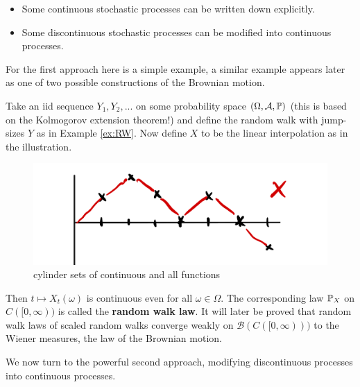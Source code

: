 \begin{itemize}
	\item Some continuous stochastic processes can be written down explicitly.
	\item Some discontinuous stochastic processes can be modified into continuous processes.
\end{itemize}
For the first approach here is a simple example, a similar example appears later as one of two possible constructions of the Brownian motion.
\begin{example}
	Take an iid sequence $Y_1,Y_2,...$ on some probability space $(\Omega,\cA,\mathbb{P})$ (this is based on the Kolmogorov extension theorem!) and define the random walk with jump-sizes $Y$ as in Example \ref{ex:RW}. Now define $X$ to be the linear interpolation as in the illustration. 
	\begin{figure}[h]
		\begin{center}
			\includegraphics[scale=0.07]{RW.jpeg}
			\caption*{cylinder sets of continuous and all functions}
		\end{center}
	\end{figure}
	Then $t\mapsto X_t(\omega)$ is continuous even for all $\omega \in \Omega$. The corresponding law $\P_X$ on $C( [0,\infty))$ is called the \textbf{random walk law}. It will later be proved that random walk laws of scaled random walks converge weakly on $\mathcal B(C( [0,\infty) ))$ to the Wiener measures, the law of the Brownian motion.
\end{example}
We now turn to the powerful second approach, modifying discontinuous processes into continuous processes.
